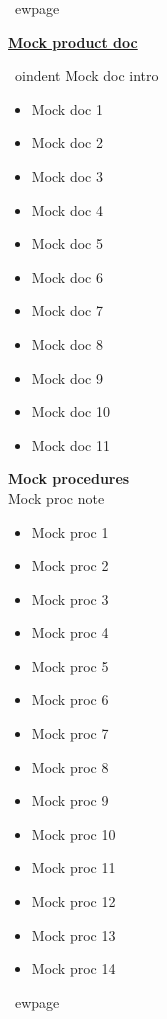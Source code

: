 \documentclass[a4paper,11pt]{article}
\begin{document}
\
ewpage

\begin{center}{\large\textbf{\underline{\color{marooncolor}Mock product doc}}}\end{center}
\vspace{0.2cm}
\
oindent Mock doc intro
\vspace{0.1cm}
\begin{itemize}[leftmargin=1.5em, itemsep=3pt, topsep=2pt]
\item Mock doc 1
\item Mock doc 2
\item Mock doc 3
\item Mock doc 4
\item Mock doc 5
\item Mock doc 6
\item Mock doc 7
\item Mock doc 8
\item Mock doc 9
\item Mock doc 10
\item Mock doc 11
\end{itemize}

\vspace{0.3cm}
\begin{center}
  {\large\textbf{\color{marooncolor}Mock procedures}}\\[4pt]
  {\small\color{marooncolor}Mock proc note}
\end{center}
\vspace{0.1cm}
\begin{itemize}[leftmargin=1.5em, itemsep=3pt, topsep=2pt]
\item Mock proc 1
\item Mock proc 2
\item Mock proc 3
\item Mock proc 4
\item Mock proc 5
\item Mock proc 6
\item Mock proc 7
\item Mock proc 8
\item Mock proc 9
\item Mock proc 10
\item Mock proc 11
\item Mock proc 12
\item Mock proc 13
\item Mock proc 14
\end{itemize}

\
ewpage
\end{document}
